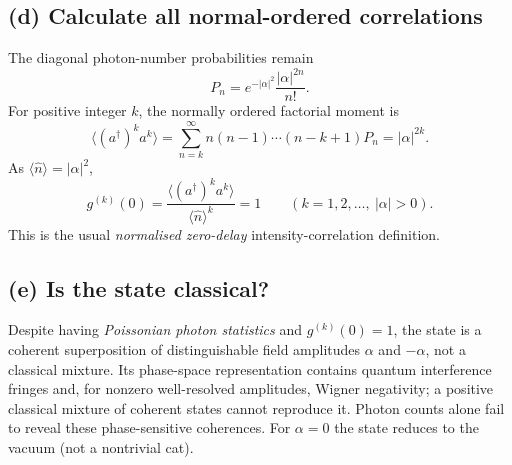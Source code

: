 \subsection*{(d) Calculate all normal-ordered correlations}
The diagonal photon-number probabilities remain
\[
P_n=e^{-|\alpha|^2}\frac{|\alpha|^{2n}}{n!}.
\]
For positive integer \(k\), the normally
ordered factorial moment is
\[
\langle(a^\dagger)^ka^k\rangle
=\sum_{n=k}^\infty
n(n-1)\cdots(n-k+1)P_n=|\alpha|^{2k}.
\]
As \(\langle\hat n\rangle=|\alpha|^2\),
\[
\boxed{g^{(k)}(0)=
\frac{\langle(a^\dagger)^ka^k\rangle}{
\langle\hat n\rangle^k}=1
\qquad(k=1,2,\ldots,\ |\alpha|>0).}
\]
This is the usual \emph{normalised zero-delay}
intensity-correlation definition.

\subsection*{(e) Is the state classical?}
Despite having \emph{Poissonian photon statistics}
and \(g^{(k)}(0)=1\), the state is a coherent
superposition of distinguishable field amplitudes
\(\alpha\) and \(-\alpha\), not a classical mixture.
Its phase-space representation contains quantum
interference fringes and, for nonzero well-resolved
amplitudes, Wigner negativity; a positive classical
mixture of coherent states cannot reproduce it.
Photon counts alone fail to reveal these
phase-sensitive coherences. For \(\alpha=0\) the
state reduces to the vacuum (not a nontrivial cat).
